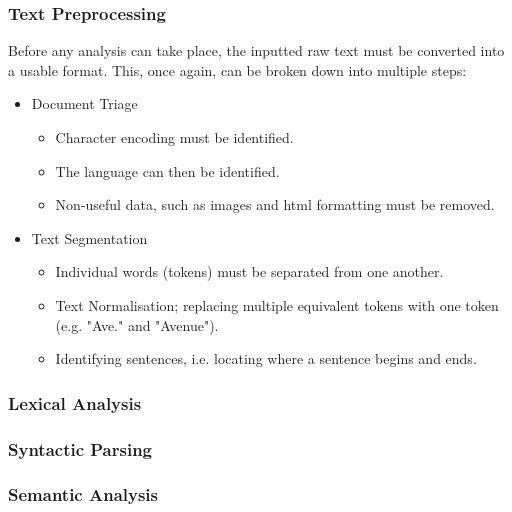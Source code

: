 \documentclass[twocolumn]{article}
\begin{document}
\subsubsection{Text Preprocessing}
\label{sec:TextPreprocessing}
Before any analysis can take place, the inputted raw text must be converted into a usable format. This, once again, can be broken down into multiple steps\cite{NLPHandbook}:
\begin{itemize}
	\item Document Triage

	\begin{itemize}
		\item Character encoding must be identified.
		\item The language can then be identified. %
		\item Non-useful data, such as images and html formatting must be removed.
	\end{itemize}
	
	\item Text Segmentation
	
	\begin{itemize}
		\item Individual words (tokens) must be separated from one another. %
		\item Text Normalisation; replacing multiple equivalent tokens with one token (e.g. "Ave." and "Avenue").
		\item Identifying sentences, i.e. locating where a sentence begins and ends. 
	\end{itemize}
	
\end{itemize} 



\subsubsection{Lexical Analysis}
\label{sec:LexicalAnalysis}


\subsubsection{Syntactic Parsing}
\label{sec:SyntacticParsing}


\subsubsection{Semantic Analysis}
\label{sec:SemanticAnalysis}




\end{document}
